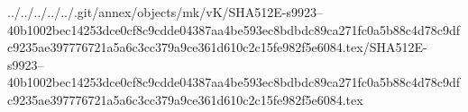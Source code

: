 ../../../../../.git/annex/objects/mk/vK/SHA512E-s9923--40b1002bec14253dce0cf8c9cdde04387aa4be593ec8bdbdc89ca271fc0a5b88c4d78c9dfc9235ae397776721a5a6c3cc379a9ce361d610c2c15fe982f5e6084.tex/SHA512E-s9923--40b1002bec14253dce0cf8c9cdde04387aa4be593ec8bdbdc89ca271fc0a5b88c4d78c9dfc9235ae397776721a5a6c3cc379a9ce361d610c2c15fe982f5e6084.tex